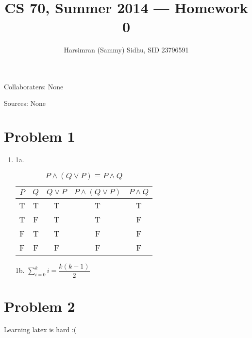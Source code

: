 \documentclass[11pt,letterpaper]{article}
\title{CS 70, Summer 2014 --- Homework 0} %
\author{Harsimran (Sammy) Sidhu, SID 23796591} %
\begin{document}
\maketitle

Collaboraters: None

Sources: None

\section*{Problem 1} %

\begin{enumerate}
\item 1a. 

\begin{table}[h] 
\caption{$P\wedge (Q\vee P) \equiv P \wedge Q$} %
\centering %
\begin{tabular}{c c c c c} %
\hline %
$P$ & $Q$ & $Q\vee{P}$ & $P\wedge{(Q\vee P)}$ & $P\wedge Q$ \\ %
\hline %
T & T & T & T & T \\
T & F & T & T & F \\
F & T & T & F & F \\
F & F & F & F & F \\ %
\hline %
\end{tabular} 
\label{table:1a} %
\end{table}



\item[1b.] $\sum\limits_{i=0}^k i=\dfrac{k(k+1)}{2}$


\end{enumerate}

\newpage

\section*{Problem 2}

Learning latex is hard :(
\end{document}
